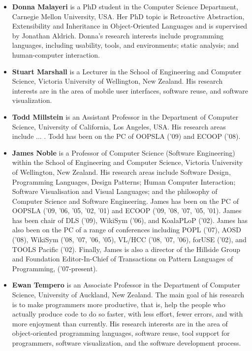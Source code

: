 \documentclass{acm_proc_article-sp}
\begin{document}
\begin{itemize}
\item \textbf{Donna Malayeri} is a PhD student in the Computer Science Department, Carnegie Mellon University, USA. Her PhD topic is Retroactive Abstraction, Extensibility and Inheritance in Object-Oriented Languages and is supervised by Jonathan Aldrich. Donna's research interests include programming languages, including usability, tools, and environments; static analysis;  and human-computer interaction. 

\item \textbf{Stuart Marshall} is a Lecturer in the School of Engineering and Computer Science, Victoria University of Wellington, New Zealand. His research interests are in the area of mobile user interfaces, software reuse, and software visualization.

\item \textbf{Todd Millstein} is an Assistant Professor in the Department of Computer Science, University of California, Los Angeles, USA. His research areas include ... . Todd has been on the PC of OOPSLA ('09) and ECOOP ('08).

\item \textbf{James Noble} is a Professor of Computer Science (Software Engineering) within the School of 
Engineering and Computer Science, Victoria University of Wellington, New Zealand. 
His research areas include Software Design, Programming Languages, Design Patterns; 
Human Computer Interaction; Software Visualisation and Visual Languages; and the philosophy of Computer Science and Software Engineering. James has been on the PC of OOPSLA ('09, '06, '05, '02, '01) and ECOOP ('09, '08, '07, '05, '01). James has been chair of DLS ('09), WikiSym ('06), and KoalaPLoP ('02). James has also been on the PC of a range of conferences including POPL ('07), AOSD ('08), WikiSym ('08, '07, '06, '05), VL/HCC ('08, '07, '06), forUSE ('02), and TOOLS Pacific ('02). Finally, James is also a director of the Hillside Group and Foundation Editor-In-Chief of Transactions on Pattern Languages of Programming, ('07-present).

\item \textbf{Ewan Tempero} is an Associate Professor in the Department of Computer Science, University of Auckland, New Zealand. The main goal of his research is to make programmers more productive, that is, help the people who actually produce code to do so faster, with less effort, fewer errors, and with more enjoyment than currently. His research interests are in the area of object-oriented programming languages, software reuse, tool support for programmers, software visualization, and the software development process.

\end{itemize}
\end{document}
